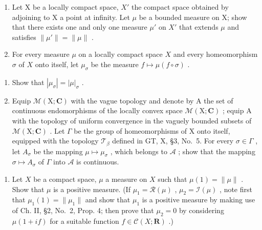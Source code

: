 \begin{enumerate}
\def\labelenumi{\arabic{enumi})}
\setcounter{enumi}{15}
\item
  Let X be a locally compact space, \(X'\) the compact space obtained by adjoining to X a point at infinity. Let \(\mu\) be a bounded measure on X; show that there exists one and only one measure \(\mu'\) on \(X'\) that extends \(\mu\) and satisfies \(\|\mu'\| = \|\mu\|\) .
\item
  For every measure \(\mu\) on a locally compact space \(X\) and every homeomorphism \(\sigma\) of \(X\) onto itself, let \(\mu_{\sigma}\) be the measure \(f \mapsto \mu(f \circ \sigma)\) .
\end{enumerate}

\begin{enumerate}
\def\labelenumi{\alph{enumi})}
\item
  Show that \(|\mu_{\sigma}| = |\mu|_{\sigma}\) .
\item
  Equip \(\mathcal{M}(\mathrm{X};\mathbf{C})\) with the vague topology and denote by A the set of continuous endomorphisms of the locally convex space \(\mathcal{M}(\mathrm{X};\mathbf{C})\) ; equip A with the topology of uniform convergence in the vaguely bounded subsets of \(\mathcal{M}(\mathrm{X};\mathbf{C})\) . Let \(\Gamma\) be the group of homeomorphisms of X onto itself, equipped with the topology \(\mathcal{T}_{\beta}\) defined in GT, X, §3, No.~5. For every \(\sigma \in \Gamma\) , let \(A_{\sigma}\) be the mapping \(\mu \mapsto \mu_{\sigma}\) , which belongs to \(\mathcal{A}\) ; show that the mapping \(\sigma \mapsto A_{\sigma}\) of \(\Gamma\) into \(\mathcal{A}\) is continuous.
\end{enumerate}

\begin{enumerate}
\def\labelenumi{\arabic{enumi})}
\setcounter{enumi}{17}
\tightlist
\item
  Let \(X\) be a compact space, \(\mu\) a measure on \(X\) such that \(\mu(1) = \| \mu \|\) . Show that \(\mu\) is a positive measure. (If \(\mu_1 = \mathcal{R}(\mu)\) , \(\mu_2 = \mathcal{I}(\mu)\) , note first that \(\mu_1(1) = \| \mu_1 \|\) and show that \(\mu_1\) is a positive measure by making use of Ch. II, §2, No.~2, Prop. 4; then prove that \(\mu_2 = 0\) by considering \(\mu(1 + if)\) for a suitable function \(f \in \mathcal{C}(X; \mathbf{R})\) .)
\end{enumerate}

\setcounter{exercisegroup}{2}
\edef\CurrentExerciseGroup{\arabic{exercisegroup}}
